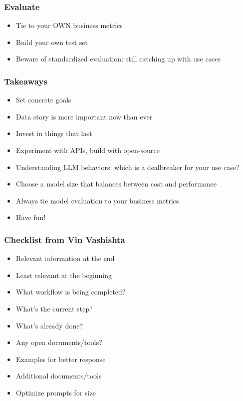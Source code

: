 \begin{frame}[fragile]\frametitle{Evaluate}

\begin{itemize}
\item Tie to your OWN business metrics
\item Build your own test set
\item Beware of standardized evaluation: still catching up with use cases
\end{itemize}	

\end{frame}

\begin{frame}[fragile]\frametitle{Takeaways}

\begin{itemize}
\item Set concrete goals
\item Data story is more important now than ever
\item Invest in things that last
\item Experiment with APIs, build with open-source
\item Understanding LLM behaviors: which is a dealbreaker for your use case?
\item Choose a model size that balances between cost and performance
\item Always tie model evaluation to your business metrics
\item Have fun!
\end{itemize}	

\end{frame}


\begin{frame}[fragile]\frametitle{Checklist from Vin Vashishta}

\begin{itemize}
\item Relevant information at the end
\item Least relevant at the beginning
\item What workflow is being completed?
\item What's the current step?
\item What's already done?
\item Any open documents/tools?
\item Examples for better response
\item Additional documents/tools
\item Optimize prompts for size
\end{itemize}	

\end{frame}